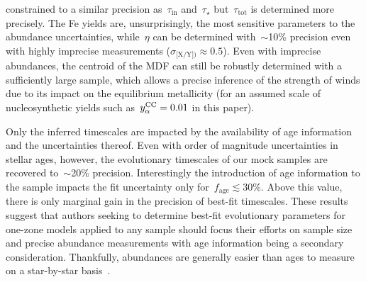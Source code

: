 \documentclass[ms.tex]{subfiles}
\begin{document}
constrained to a similar precision as~$\tau_\text{in}$ and~$\tau_\star$
but~$\tau_\text{tot}$ is determined more precisely.
The Fe yields are, unsurprisingly, the most sensitive parameters to the
abundance uncertainties, while~$\eta$ can be determined with~$\sim$10\% precision
even with highly imprecise measurements ($\sigma_\text{[X/Y])} \approx 0.5$).
Even with imprecise abundances, the centroid of the MDF can still be robustly
determined with a sufficiently large sample, which allows a precise inference
of the strength of winds due to its impact on the equilibrium metallicity (for
an assumed scale of nucleosynthetic yields such as~$y_\alpha^\text{CC} = 0.01$ in this
paper).
\par
Only the inferred timescales are impacted by the availability of age
information and the uncertainties thereof.
Even with order of magnitude uncertainties in stellar ages, however, the
evolutionary timescales of our mock samples are recovered to~$\sim$20\%
precision.
Interestingly the introduction of age information to the sample impacts the
fit uncertainty only for~$f_\text{age} \lesssim 30$\%.
Above this value, there is only marginal gain in the precision of best-fit
timescales.
These results suggest that authors seeking to determine best-fit evolutionary
parameters for one-zone models applied to any sample should focus their efforts
on sample size and precise abundance measurements with age information being
a secondary consideration.
Thankfully, abundances are generally easier than ages to measure on a
star-by-star basis~\citep{Soderblom2010, Chaplin2013}.
\end{document}

